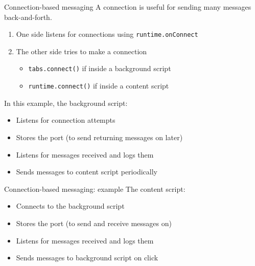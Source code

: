 \documentclass[../index.tex]{subfiles}
\begin{document}
\renewcommand{\currenttitle}{Connection-based messaging}
\begin{frame}[fragile]{\currenttitle}
  A connection is useful for sending many messages back-and-forth. \\

  \begin{enumerate}
    \item One side listens for connections using \texttt{runtime.onConnect}
    \item The other side tries to make a connection
      \begin{itemize}
        \item \texttt{tabs.connect()} if inside a background script
        \item \texttt{runtime.connect()} if inside a content script
      \end{itemize}
  \end{enumerate}
  In this example, the background script:

  \begin{itemize}
    \item Listens for connection attempts
    \item Stores the port (to send returning messages on later)
    \item Listens for messages received and logs them
    \item Sends messages to content script periodically
  \end{itemize}

\end{frame}

\renewcommand{\currenttitle}{Connection-based messaging: example}
\begin{frame}[fragile]{\currenttitle}
  The content script:
  
  \begin{itemize}
    \item Connects to the background script
    \item Stores the port (to send and receive messages on)
    \item Listens for messages received and logs them
    \item Sends messages to background script on click
  \end{itemize}
\end{frame}
\end{document}
